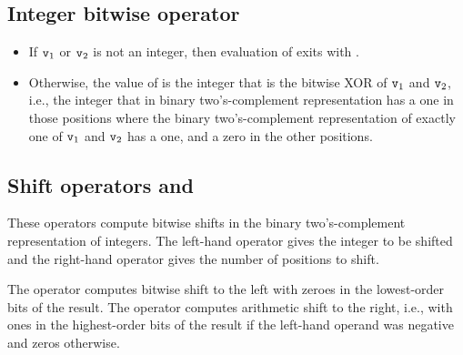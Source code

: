 \subsection{Integer bitwise operator }

\label{section:bitwisexor}

\begin{itemize}
\item If ${\tt{\sl v}}_1$ or ${\tt{\sl v}}_2$ is not an integer, then
      evaluation of  exits with \T{\badarith}.
\item Otherwise, the value of  is the integer
      that is the bitwise XOR of ${\tt{\sl v}}_1$ and ${\tt{\sl v}}_2$,
      i.e., the integer that in binary two's-com\-ple\-ment
      representation has a one in those positions where the binary
      two's-com\-ple\-ment representation of exactly one of
      ${\tt{\sl v}}_1$ and ${\tt{\sl v}}_2$ has a one,
      and a zero in the other positions.
\end{itemize}

\subsection{Shift operators  and }

\label{section:shift-ops}

These operators compute bitwise shifts in the binary two's-com\-ple\-ment
representation of integers.
The left-hand operator gives the integer to be shifted and the right-hand
operator gives the number of positions to shift.

The  operator computes bitwise shift to the left with zeroes in
the lowest-order bits of the result.  The  operator computes
arithmetic shift to the right, i.e., with ones in
the highest-order bits of the result if the left-hand operand was negative
and zeros otherwise.

